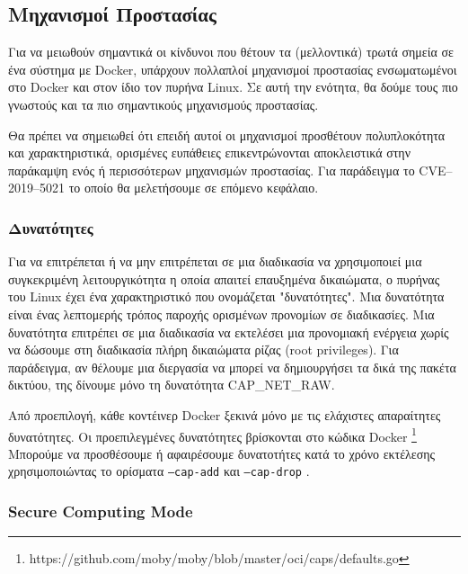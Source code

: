 \subsection{Μηχανισμοί Προστασίας}

Για να μειωθούν σημαντικά οι κίνδυνοι που θέτουν τα (μελλοντικά) τρωτά σημεία
σε ένα σύστημα με \textlatin{Docker}, υπάρχουν πολλαπλοί μηχανισμοί προστασίας
ενσωματωμένοι στο \textlatin{Docker} και στον ίδιο τον πυρήνα \textlatin{Linux}.
Σε αυτή την ενότητα, θα δούμε τους πιο γνωστούς και τα πιο σημαντικούς
μηχανισμούς προστασίας.

Θα πρέπει να σημειωθεί ότι επειδή αυτοί οι μηχανισμοί προσθέτουν πολυπλοκότητα
και χαρακτηριστικά, ορισμένες ευπάθειες επικεντρώνονται αποκλειστικά στην
παράκαμψη ενός ή περισσότερων μηχανισμών προστασίας. Για παράδειγμα το
\textlatin{CVE–2019–5021} το οποίο θα μελετήσουμε σε επόμενο κεφάλαιο.

\subsubsection{Δυνατότητες}

Για να επιτρέπεται ή να μην επιτρέπεται σε μια διαδικασία να χρησιμοποιεί μια
συγκεκριμένη λειτουργικότητα η οποία απαιτεί επαυξημένα δικαιώματα,
ο πυρήνας του \textlatin{Linux} έχει ένα χαρακτηριστικό που ονομάζεται
"δυνατότητες". Μια δυνατότητα είναι ένας λεπτομερής τρόπος παροχής ορισμένων
προνομίων σε διαδικασίες. Μια δυνατότητα επιτρέπει σε μια διαδικασία να
εκτελέσει μια προνομιακή ενέργεια χωρίς να δώσουμε στη διαδικασία πλήρη
δικαιώματα ρίζας (\textlatin{root privileges}). Για παράδειγμα, αν θέλουμε μια
διεργασία να μπορεί να δημιουργήσει τα δικά της πακέτα δικτύου, της δίνουμε
μόνο τη δυνατότητα \textlatin{CAP\_NET\_RAW}.

Από προεπιλογή, κάθε κοντέινερ \textlatin{Docker} ξεκινά μόνο με τις ελάχιστες
απαραίτητες δυνατότητες. Οι προεπιλεγμένες δυνατότητες βρίσκονται στο κώδικα
\textlatin{Docker}
\footnote{\textlatin{https://github.com/moby/moby/blob/master/oci/caps/defaults.go}}
Μπορούμε να προσθέσουμε ή αφαιρέσουμε δυνατοτήτες κατά το χρόνο εκτέλεσης
χρησιμοποιώντας το ορίσματα \texttt{\textlatin{--cap-add}} και
\texttt{\textlatin{--cap-drop}} \cite{More-Secure-Non-Root-Container}.

\subsubsection{\textlatin{Secure Computing Mode}}

